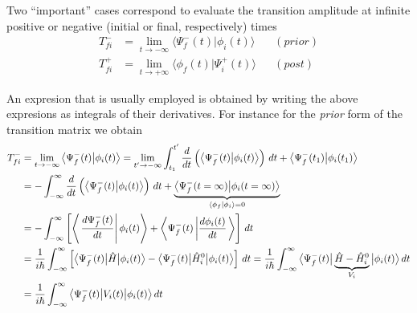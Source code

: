 Two ``important'' cases correspond to evaluate the transition amplitude at infinite positive or negative (initial or final, respectively) times
\begin{subequations}
  \begin{align}
    \label{Q:T_fi-prior} T_{fi}^{-} &= \lim_{t \to -\infty}\big\langle \Psi^{-}_{f}(t) \big|\phi_{i}(t) \big\rangle  &&(\mathit{prior})\\
    \label{Q:T_fi-post} T_{fi}^{+} &= \lim_{t \to +\infty}\big\langle \phi_{f}(t) \big| \Psi^{+}_{i}(t) \big\rangle  &&(\mathit{post})
  \end{align}
\end{subequations}

An expresion that is usually employed is obtained by writing the above expresions as integrals of their derivatives. For instance for the \textit{prior} form of the transition matrix we obtain
\begin{subequations}
  \begin{align}\label{Q:td-T_fi-prior-work-expre-1}
    T_{fi}^{-} &= \lim_{t \to -\infty}\big\langle \Psi^{-}_{f}(t) \big|\phi_{i}(t) \big\rangle=  \lim_{t' \to -\infty} \int_{t_{1}}^{t'} \frac{d}{dt}\left( \big\langle \Psi^{-}_{f}(t) \big|\phi_{i}(t) \big\rangle \right) \, dt +  \big\langle \Psi^{-}_{f}(t_{1}) \big|\phi_{i}(t_{1}) \big\rangle  \\
    &= - \int_{-\infty}^{\infty} \frac{d}{dt}\left( \big\langle \Psi^{-}_{f}(t) \big|\phi_{i}(t) \big\rangle \right) \, dt +  \underbrace{\big\langle \Psi^{-}_{f}(t=\infty) \big|\phi_{i}(t=\infty)\big\rangle}_{\langle \phi_{f}|\phi_{i}\rangle=0} \notag \\
    &= - \int_{-\infty}^{\infty}  \left[ \left\langle \left. \frac{d \Psi^{-}_{f}(t) }{dt}  \right|\phi_{i}(t)\right\rangle  +  \left\langle \Psi^{-}_{f}(t) \left|\frac{d \phi_{i}(t)}{dt} \right. \right\rangle \right]  \, dt \notag \\
    &= \frac{1}{i \hbar} \int_{-\infty}^{\infty} \left[ \big\langle \Psi^{-}_{f}(t) \big|
      \hat{H} \big| \phi_{i}(t) \big\rangle - \big\langle \Psi^{-}_{f}(t) \big|
      \hat{H}_{i}^{0} \big| \phi_{i}(t) \big\rangle \right] \, dt =
    \frac{1}{i \hbar} \int_{-\infty}^{\infty} \big\langle \Psi^{-}_{f}(t) \big| \underbrace{\hat{H} - \hat{H}_{i}^{0}}_{V_{i}} \big| \phi_{i}(t) \big\rangle   \, dt \notag \\
\label{Q:td-T_fi-prior-work-expre-2}    &= \frac{1}{i \hbar} \int_{-\infty}^{\infty} \big\langle \Psi^{-}_{f}(t) \big| V_{i}(t) \big| \phi_{i}(t) \big\rangle \, dt
  \end{align}
\end{subequations}
